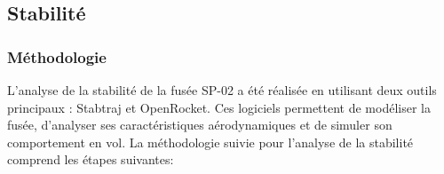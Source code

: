 \subsection{Stabilité}
\label{subsec:stabilite}

\subsubsection{Méthodologie}
\label{subsubsec:stabilite_methode}

L'analyse de la stabilité de la fusée SP-02 a été réalisée en utilisant deux outils principaux : \gls{Stabtraj} et
\gls{OpenRocket}. Ces logiciels permettent de modéliser la fusée, d'analyser ses caractéristiques aérodynamiques et de simuler
son comportement en vol. La méthodologie suivie pour l'analyse de la stabilité comprend les étapes suivantes:\\

